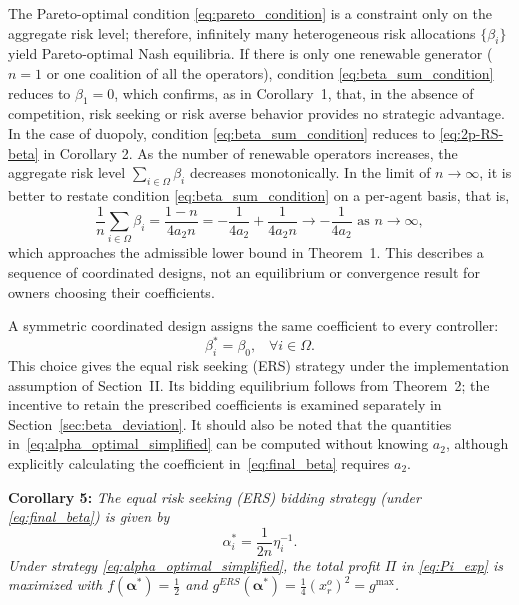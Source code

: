 \documentclass[journal]{IEEEtran}
\begin{document}
The Pareto-optimal condition \eqref{eq:pareto_condition} is a constraint only on the aggregate risk level; therefore, infinitely many heterogeneous risk allocations $\{\beta_i\}$ yield Pareto-optimal Nash equilibria.
If there is only one renewable generator ($n=1$ or one coalition of all the operators), condition \eqref{eq:beta_sum_condition} reduces to $\beta_1 = 0$,
which confirms, as in Corollary~1, that, in the absence of competition, risk seeking or risk averse behavior provides no strategic advantage. In the case of duopoly, condition \eqref{eq:beta_sum_condition} reduces to \eqref{eq:2p-RS-beta} in Corollary 2. As the number of renewable operators increases, the aggregate risk level $\sum_{i\in\Omega} \beta_i$ decreases monotonically. In the limit of $n\to\infty$, it is better to restate condition \eqref{eq:beta_sum_condition} on a per-agent basis, that is, 
\[
\frac{1}{n}\sum_{i\in\Omega} \beta_i
= \frac{1-n}{4a_2 n}
= -\frac{1}{4a_2} + \frac{1}{4a_2 n} \to 
 -\frac{1}{4a_2} \mbox{ as } n\to\infty, 
\]
which approaches the admissible lower bound in Theorem~1. This describes a sequence of coordinated designs, not an equilibrium or convergence result for owners choosing their coefficients.

A symmetric coordinated design assigns the same coefficient to every controller:
\begin{equation}
    \beta_i^*=\beta_0, \;\;\; \forall i\in\Omega. \label{eq:final_beta}
\end{equation}   
This choice gives the equal risk seeking (ERS) strategy under the implementation assumption of Section~II. Its bidding equilibrium follows from Theorem~2; the incentive to retain the prescribed coefficients is examined separately in Section~\ref{sec:beta_deviation}. It should also be noted that the quantities in~\eqref{eq:alpha_optimal_simplified} can be computed without knowing $a_2$, although explicitly calculating the coefficient in~\eqref{eq:final_beta} requires $a_2$.

\noindent \textbf{Corollary 5:} {\it The equal risk seeking (ERS) bidding strategy (under \eqref{eq:final_beta}) is given by
\begin{equation}
    \alpha_i^* = \frac{1}{2n}\eta_i^{-1}. \label{eq:alpha_optimal_simplified}
\end{equation}
Under strategy \eqref{eq:alpha_optimal_simplified}, the total profit $\Pi$ in \eqref{eq:Pi_exp} is maximized with $f(\boldsymbol{\alpha}^*)=\tfrac12$ and $g^{ERS}(\boldsymbol{\alpha}^*)=\tfrac{1}{4}(x_r^o)^2 =g^{\max}$.}
\end{document}
